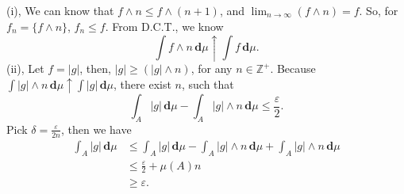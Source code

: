 \documentclass[en, normal, 11pt, black]{elegantnote}
\renewenvironment{proof}{\begin{tcolorbox}[colback=white, colframe=black!50, breakable, title=Proof. ]\setlength{\parskip}{0.8em}}{\\\rightline{$\square$}\end{tcolorbox}}
\newcommand{\der}{\,\mathbf{d}}
\begin{document}
    \begin{proof}
        (i), We can know that $f\wedge n\leqslant f\wedge (n+1)$, and $\lim_{n\to \infty}(f\wedge n)=f$. So, for $f_n=\{f\wedge n\}$, $f_n\leqslant f$. From D.C.T., we know
        \[\int f\wedge n\der\mu\uparrow\int f\der\mu. \]
        (ii), Let $f=|g|$, then, $|g|\geqslant (|g|\wedge n)$, for any $n\in\mathbb{Z}^+$. Because $\int |g|\wedge n\der\mu\uparrow\int |g|\der\mu$, there exist $n$, such that
        \[
            \int_A |g|\der\mu-\int_A |g|\wedge n\der\mu\leqslant \frac{\varepsilon}{2}. 
        \]
        Pick $\delta=\frac{\varepsilon}{2n}$, then we have
        \begin{align*}
            \int_A|g|\der\mu&\leqslant\int_A|g|\der\mu-\int_A |g|\wedge n\der\mu+\int_A |g|\wedge n\der\mu\\
            &\leqslant\frac{\varepsilon}{2}+\mu(A)n\\
            &\geqslant\varepsilon. 
        \end{align*}
        \vspace{-30pt}
    \end{proof}
\end{document}
